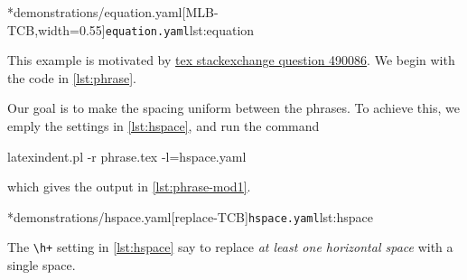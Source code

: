 \begin{example}
		\begin{cmhtcbraster}[
				raster force size=false,
				raster column 1/.style={add to width=-.1\textwidth},
				raster column skip=.06\linewidth]
			\cmhlistingsfromfile*[style=yaml-LST]*{demonstrations/equation.yaml}[MLB-TCB,width=0.55\textwidth]{\texttt{equation.yaml}}{lst:equation}
		\end{cmhtcbraster}
	\end{example}

	\begin{example}
		This example is motivated by \href{https://tex.stackexchange.com/questions/490086/bring-several-lines-together-to-fill-blank-spaces-in-texmaker}{tex stackexchange question 490086}.
		We begin with the code in \cref{lst:phrase}.


		Our goal is to make the spacing uniform between the phrases. To achieve this, we emply the settings in \cref{lst:hspace},
		and run the command
		\begin{commandshell}
latexindent.pl -r phrase.tex -l=hspace.yaml
\end{commandshell}
		which gives the output in \cref{lst:phrase-mod1}.

		\begin{cmhtcbraster}
			\cmhlistingsfromfile*[style=yaml-LST]*{demonstrations/hspace.yaml}[replace-TCB]{\texttt{hspace.yaml}}{lst:hspace}
		\end{cmhtcbraster}

		The \lstinline!\h+! setting in \cref{lst:hspace} say to replace \emph{at least one horizontal space} with a single space.
	\end{example}


